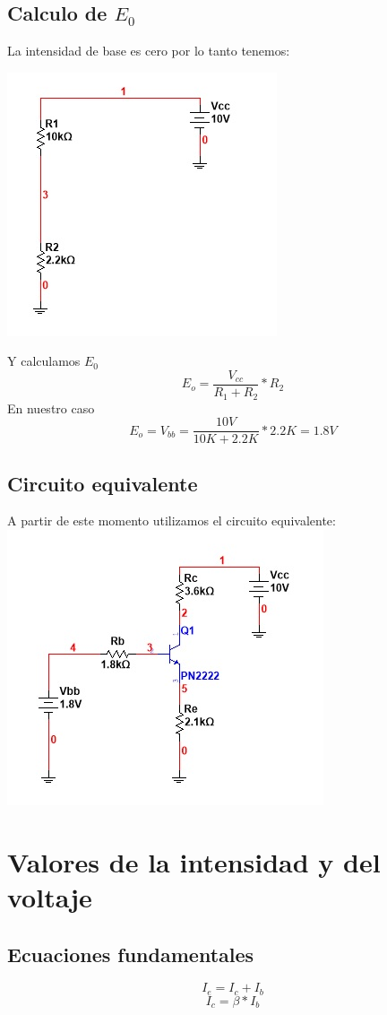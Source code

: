 \documentclass[10pt,a4paper]{article}
\begin{document}
\subsection{Calculo de $E_{0}$}
La intensidad de base es cero por lo tanto tenemos:
\begin{center}
\includegraphics[scale=1]{Images/Imagen4.jpg}
\end{center}
Y calculamos $E_{0}$
\[E_{o}=\frac{V_{cc}}{R_{1}+R_{2}}*R_{2}\]
En nuestro caso 
\[E_{o}=V_{bb}=\frac{10V}{10K+2.2K}*2.2K=1.8V\]
\subsection{Circuito equivalente}
A partir de este momento utilizamos el circuito equivalente:
\\
\includegraphics[scale=1]{Images/Imagen5.jpg}
\section{Valores de la intensidad y del voltaje}
\subsection{Ecuaciones fundamentales}
\begin{equation}
I_{e}=I_{c}+I_{b}
\end{equation}
\begin{equation}
I_{c}=\beta*I_{b}
\end{equation}
\end{document}
